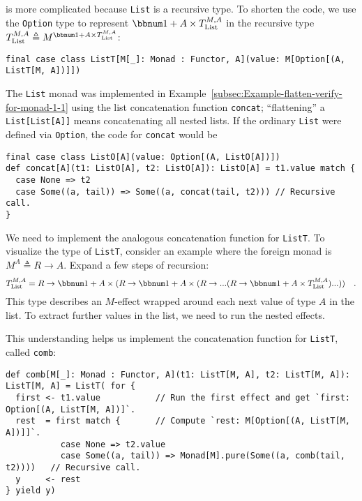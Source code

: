 is more complicated because \lstinline!List! is a recursive type.
To shorten the code, we use the \lstinline!Option! type to represent
$\bbnum 1+A\times T_{\text{List}}^{M,A}$ in the recursive type $T_{\text{List}}^{M,A}\triangleq M^{\bbnum 1+A\times T_{\text{List}}^{M,A}}$:
\begin{lstlisting}
final case class ListT[M[_]: Monad : Functor, A](value: M[Option[(A, ListT[M, A])]])
\end{lstlisting}
The \lstinline!List! monad was implemented in Example~\ref{subsec:Example-flatten-verify-for-monad-1-1}
using the list concatenation function \lstinline!concat!; \textsf{``}flattening\textsf{''}
a \lstinline!List[List[A]]! means concatenating all nested lists.
If the ordinary \lstinline!List! were defined via \lstinline!Option!,
the code for \lstinline!concat! would be
\begin{lstlisting}
final case class ListO[A](value: Option[(A, ListO[A])])
def concat[A](t1: ListO[A], t2: ListO[A]): ListO[A] = t1.value match {
  case None => t2
  case Some((a, tail)) => Some((a, concat(tail, t2))) // Recursive call.
}
\end{lstlisting}
We need to implement the analogous concatenation function for \lstinline!ListT!.
To visualize the type of \lstinline!ListT!, consider an example where
the foreign monad is $M^{A}\triangleq R\rightarrow A$. Expand a few
steps of recursion:
\[
T_{\text{List}}^{M,A}=R\rightarrow\bbnum 1+A\times(R\rightarrow\bbnum 1+A\times(R\rightarrow...(R\rightarrow\bbnum 1+A\times T_{\text{List}}^{M,A})...))\quad.
\]
This type describes an $M$-effect wrapped around each next value
of type $A$ in the list. To extract further values in the list, we
need to run the nested effects.

This understanding helps us implement the concatenation function for
\lstinline!ListT!, called \lstinline!comb!:
\begin{lstlisting}
def comb[M[_]: Monad : Functor, A](t1: ListT[M, A], t2: ListT[M, A]): ListT[M, A] = ListT( for {
  first <- t1.value           // Run the first effect and get `first: Option[(A, ListT[M, A])]`.
  rest  = first match {       // Compute `rest: M[Option[(A, ListT[M, A])]]`.
           case None => t2.value
           case Some((a, tail)) => Monad[M].pure(Some((a, comb(tail, t2))))   // Recursive call.
  y     <- rest
} yield y)
\end{lstlisting}

